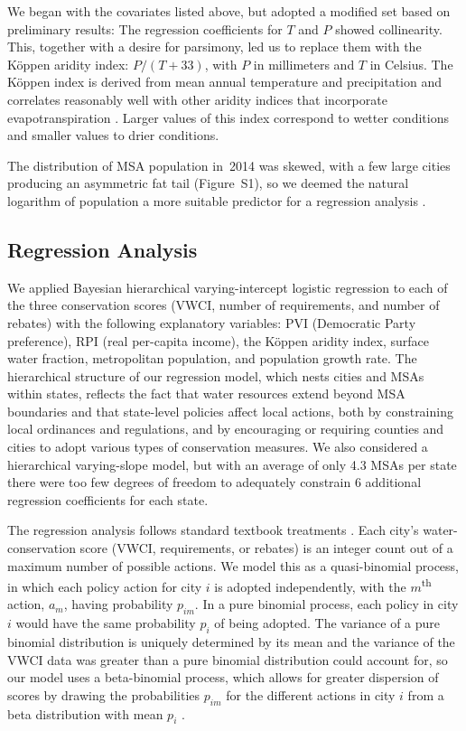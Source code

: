 \documentclass[draft,linenumbers]{agujournal}
\begin{document}
We began with the covariates listed above, but adopted a modified set based on
preliminary results: The regression coefficients for $T$ and $P$ showed
collinearity.
This, together with a desire for parsimony, led us to replace them with the
K\"oppen aridity index: $P / (T + 33)$, with $P$ in millimeters and $T$ in
Celsius.
The K\"oppen index is
derived from mean annual temperature and precipitation
and correlates reasonably well with other aridity indices
that incorporate evapotranspiration
\citep{quan:aridity:2013}.
Larger values of this index correspond to wetter conditions
and smaller values to drier conditions.

The distribution of MSA population in~2014 was skewed, with
a few large cities producing an asymmetric fat tail (Figure~S1),
so we deemed the natural logarithm of population
a more suitable predictor
for a regression analysis \citep[pp.~59--61]{gelman:arm:2007}.

\subsection{Regression Analysis}
We applied Bayesian hierarchical varying-intercept
logistic regression to each of the
three conservation scores (VWCI, number of requirements, and number of rebates)
with the following explanatory variables:
PVI (Democratic Party preference), RPI (real per-capita income),
the K\"oppen aridity index, surface water fraction,
metropolitan population, and population growth rate.
The hierarchical structure of our regression model, which nests cities and MSAs
within states, reflects the fact that water resources extend beyond MSA
boundaries and that state-level policies affect local actions, both by
constraining local ordinances and regulations, and by encouraging or requiring
counties and cities to adopt various types of conservation measures.
We also considered a hierarchical varying-slope model, but with an average
of only 4.3 MSAs per state there were too few degrees of freedom to adequately
constrain 6 additional regression coefficients for each state.

The regression analysis follows standard textbook treatments
\citep{gelman:arm:2007,gelman:bda:2014}.
Each city's water-conservation score (VWCI, requirements, or rebates) is
an integer count out of a maximum number of possible actions.
We model this as a quasi-binomial process, in which each policy action
for city $i$ is adopted independently, with
the $m$\textsuperscript{th} action, $a_m$, having probability
$p_{im}$.
In a pure binomial process, each policy in city $i$ would have the same
probability $p_i$ of being adopted.
The variance of a pure binomial distribution is uniquely determined
by its mean and the variance of the VWCI data was
greater than a pure binomial
distribution could account for,
so our model uses a beta-binomial process, which allows for greater dispersion
of scores by drawing the probabilities $p_{im}$
for the different actions in city $i$ from a beta distribution with mean $p_i$
\citep[pp.~437--38]{gelman:bda:2014}.
\end{document}
